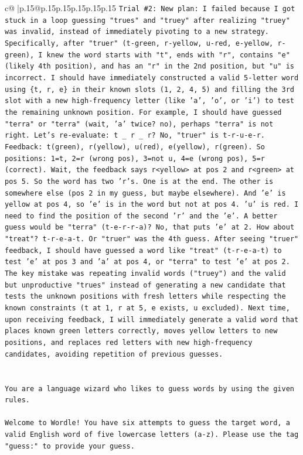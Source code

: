 \documentclass{article}
\begin{document}
{\begin{supertabular}{c@{$\;$}|p{.15\linewidth}@{}p{.15\linewidth}p{.15\linewidth}p{.15\linewidth}p{.15\linewidth}p{.15\linewidth}}
{{{\texttt{Trial \#2: New plan: I failed because I got stuck in a loop guessing "trues" and "truey" after realizing "truey" was invalid, instead of immediately pivoting to a new strategy. Specifically, after "truer" (t{-}green, r{-}yellow, u{-}red, e{-}yellow, r{-}green), I knew the word starts with "t", ends with "r", contains "e" (likely 4th position), and has an "r" in the 2nd position, but "u" is incorrect. I should have immediately constructed a valid 5{-}letter word using \{t, r, e\} in their known slots (1, 2, 4, 5) and filling the 3rd slot with a new high{-}frequency letter (like 'a', 'o', or 'i') to test the remaining unknown position. For example, I should have guessed "terra" or "terra" (wait, 'a' twice? no), perhaps "terra" is not right. Let's re{-}evaluate: t \_ r \_ r? No, "truer" is t{-}r{-}u{-}e{-}r. Feedback: t(green), r(yellow), u(red), e(yellow), r(green). So positions: 1=t, 2=r (wrong pos), 3=not u, 4=e (wrong pos), 5=r (correct). Wait, the feedback says r<yellow> at pos 2 and r<green> at pos 5. So the word has two 'r's. One is at the end. The other is somewhere else (pos 2 in my guess, but maybe elsewhere). And 'e' is yellow at pos 4, so 'e' is in the word but not at pos 4. 'u' is red. I need to find the position of the second 'r' and the 'e'. A better guess would be "terra" (t{-}e{-}r{-}r{-}a)? No, that puts 'e' at 2. How about "treat"? t{-}r{-}e{-}a{-}t. Or "truer" was the 4th guess. After seeing "truer" feedback, I should have guessed a word like "treat" (t{-}r{-}e{-}a{-}t) to test 'e' at pos 3 and 'a' at pos 4, or "terra" to test 'e' at pos 2. The key mistake was repeating invalid words ("truey") and the valid but unproductive "trues" instead of generating a new candidate that tests the unknown positions with fresh letters while respecting the known constraints (t at 1, r at 5, e exists, u excluded). Next time, upon receiving feedback, I will immediately generate a valid word that places known green letters correctly, moves yellow letters to new positions, and replaces red letters with new high{-}frequency candidates, avoiding repetition of previous guesses.} \\
\\ 
\\ 
\texttt{You are a language wizard who likes to guess words by using the given rules.} \\
\\ 
\texttt{Welcome to Wordle! You have six attempts to guess the target word, a valid English word of five lowercase letters (a{-}z). Please use the tag "guess:" to provide your guess.} \\
}}}
\end{supertabular}}
\end{document}
